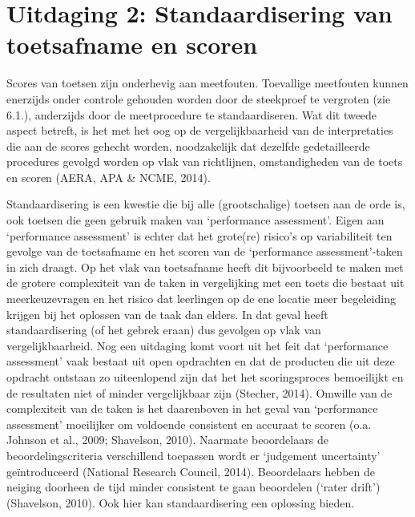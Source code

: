 \documentclass[
  letterpaper,
]{report}
\begin{document}
\hypertarget{uitdaging-2-standaardisering-van-toetsafname-en-scoren}{%
\section{Uitdaging 2: Standaardisering van toetsafname en
scoren}\label{uitdaging-2-standaardisering-van-toetsafname-en-scoren}}

Scores van toetsen zijn onderhevig aan meetfouten. Toevallige meetfouten
kunnen enerzijds onder controle gehouden worden door de steekproef te
vergroten (zie 6.1.), anderzijds door de meetprocedure te
standaardiseren. Wat dit tweede aspect betreft, is het met het oog op de
vergelijkbaarheid van de interpretaties die aan de scores gehecht
worden, noodzakelijk dat dezelfde gedetailleerde procedures gevolgd
worden op vlak van richtlijnen, omstandigheden van de toets en scoren
(AERA, APA \& NCME, 2014).

Standaardisering is een kwestie die bij alle (grootschalige) toetsen aan
de orde is, ook toetsen die geen gebruik maken van `performance
assessment'. Eigen aan `performance assessment' is echter dat het
grote(re) risico's op variabiliteit ten gevolge van de toetsafname en
het scoren van de `performance assessment'-taken in zich draagt. Op het
vlak van toetsafname heeft dit bijvoorbeeld te maken met de grotere
complexiteit van de taken in vergelijking met een toets die bestaat uit
meerkeuzevragen en het risico dat leerlingen op de ene locatie meer
begeleiding krijgen bij het oplossen van de taak dan elders. In dat
geval heeft standaardisering (of het gebrek eraan) dus gevolgen op vlak
van vergelijkbaarheid. Nog een uitdaging komt voort uit het feit dat
`performance assessment' vaak bestaat uit open opdrachten en dat de
producten die uit deze opdracht ontstaan zo uiteenlopend zijn dat het
het scoringsproces bemoeilijkt en de resultaten niet of minder
vergelijkbaar zijn (Stecher, 2014). Omwille van de complexiteit van de
taken is het daarenboven in het geval van `performance assessment'
moeilijker om voldoende consistent en accuraat te scoren (o.a. Johnson
et al., 2009; Shavelson, 2010). Naarmate beoordelaars de
beoordelingscriteria verschillend toepassen wordt er `judgement
uncertainty' geïntroduceerd (National Research Council, 2014).
Beoordelaars hebben de neiging doorheen de tijd minder consistent te
gaan beoordelen (`rater drift') (Shavelson, 2010). Ook hier kan
standaardisering een oplossing bieden.
\end{document}
